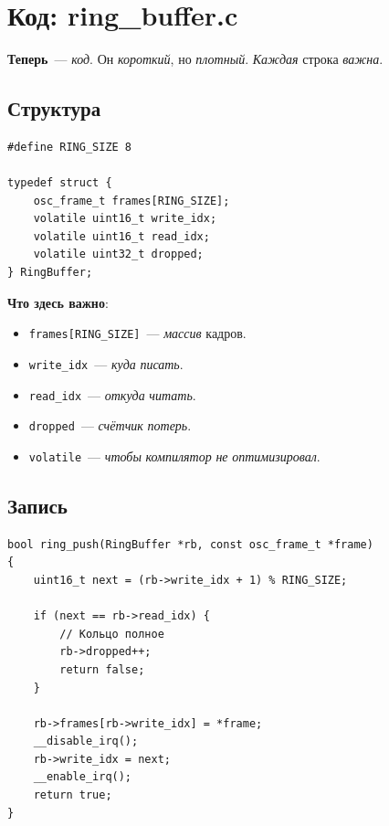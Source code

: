 \section{Код: ring\_buffer.c}
\label{sec:ring-code}

\textbf{Теперь}~--- \emph{код}. Он \emph{короткий}, но
\emph{плотный}. \emph{Каждая} строка \emph{важна}.

\subsection{Структура}

\begin{listing}[htbp]
\begin{verbatim}
#define RING_SIZE 8

typedef struct {
    osc_frame_t frames[RING_SIZE];
    volatile uint16_t write_idx;
    volatile uint16_t read_idx;
    volatile uint32_t dropped;
} RingBuffer;
\end{verbatim}
\caption{Структура \texttt{RingBuffer}}
\label{lst:ring-struct}
\end{listing}

\textbf{Что здесь важно}:
\begin{itemize}
    \item \texttt{frames[RING\_SIZE]}~--- \emph{массив}
          кадров.
    \item \texttt{write\_idx}~--- \emph{куда} \emph{писать}.
    \item \texttt{read\_idx}~--- \emph{откуда} \emph{читать}.
    \item \texttt{dropped}~--- \emph{счётчик} \emph{потерь}.
    \item \texttt{volatile}~--- \emph{чтобы} \emph{компилятор}
          \emph{не} \emph{оптимизировал}.
\end{itemize}

\subsection{Запись}

\begin{listing}[htbp]
\begin{verbatim}
bool ring_push(RingBuffer *rb, const osc_frame_t *frame)
{
    uint16_t next = (rb->write_idx + 1) % RING_SIZE;

    if (next == rb->read_idx) {
        // Кольцо полное
        rb->dropped++;
        return false;
    }

    rb->frames[rb->write_idx] = *frame;
    __disable_irq();
    rb->write_idx = next;
    __enable_irq();
    return true;
}
\end{verbatim}
\caption{\texttt{ring\_push()}~--- запись}
\label{lst:ring-push}
\end{listing}

